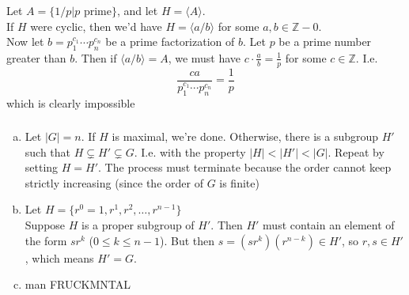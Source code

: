 \documentclass{article}
\newcommand{\ints}{\mathbb{Z}}
\newcommand{\set}[1]{ \{ #1 \} }
\newcommand{\norm}[1]{|#1|}
\newcommand{\cyclic}[1]{\langle#1\rangle}
\begin{document}
\subsubsection{}\label{ex4p15}
Let $A=\set{1/p | p \mbox{ prime}}$, and let $H=\cyclic{A}$.\\
If $H$ were cyclic, then we'd have $H=\cyclic{a/b}$ for some $a,b \in\ints-0$.\\
Now let $b = p_1^{c_1}\cdots p_n^{c_n}$ be a prime factorization of $b$. Let $p$ be a prime number greater than $b$. Then if $\cyclic{a/b} = A$, we must have $c\cdot \frac{a}{b} = \frac{1}{p}$ for some $c \in \ints$. I.e.
\begin{equation}
\frac{ca}{p_1^{c_1}\cdots p_n^{c_n}} = \frac{1}{p}
\end{equation}
which is clearly impossible
\subsubsection{}\label{ex4p16}
\begin{enumerate}[(a)]
\item 
Let $\norm{G}=n$. If $H$ is maximal, we're done. Otherwise, there is a subgroup $H'$ such that $H \subsetneq H' \subsetneq G$. I.e. with the property $\norm{H}<\norm{H'}<\norm{G}$. Repeat by setting $H=H'$. The process must terminate because the order cannot keep strictly increasing (since the order of $G$ is finite)
\item Let $H=\set{r^0=1,r^1,r^2,\ldots,r^{n-1}}$\\
Suppose $H$ is a proper subgroup of $H'$. Then $H'$ must contain an element of the form $sr^k$ ($0\leq k\leq n-1$). But then $s=(sr^k)(r^{n-k}) \in H'$, so $r,s\in H'$, which means $H'=G$.
\item man FRUCKMNTAL
\end{enumerate}
\end{document}
